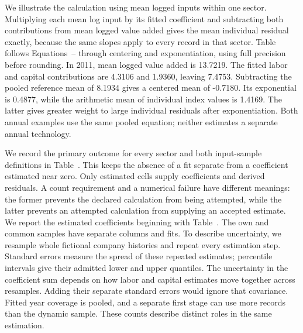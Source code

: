 We illustrate the calculation using mean logged inputs within one sector. Multiplying each mean log input by its fitted coefficient and subtracting both contributions from mean logged value added gives the mean individual residual exactly, because the same slopes apply to every record in that sector. Table~ follows Equations~-- through centering and exponentiation, using full precision before rounding.
In 2011, mean logged value added is 13.7219. The fitted labor and capital contributions are 4.3106 and 1.9360, leaving 7.4753. Subtracting the pooled reference mean of 8.1934 gives a centered mean of -0.7180. Its exponential is 0.4877, while the arithmetic mean of individual index values is 1.4169. The latter gives greater weight to large individual residuals after exponentiation. Both annual examples use the same pooled equation; neither estimates a separate annual technology.


We record the primary outcome for every sector and both input-sample definitions in Table~. This keeps the absence of a fit separate from a coefficient estimated near zero.
Only estimated cells supply coefficients and derived residuals. A count requirement and a numerical failure have different meanings: the former prevents the declared calculation from being attempted, while the latter prevents an attempted calculation from supplying an accepted estimate.
We report the estimated coefficients beginning with Table~. The own and common samples have separate columns and fits. To describe uncertainty, we resample whole fictional company histories and repeat every estimation step. Standard errors measure the spread of these repeated estimates; percentile intervals give their admitted lower and upper quantiles.
The uncertainty in the coefficient sum depends on how labor and capital estimates move together across resamples. Adding their separate standard errors would ignore that covariance. Fitted year coverage is pooled, and a separate first stage can use more records than the dynamic sample. These counts describe distinct roles in the same estimation.

